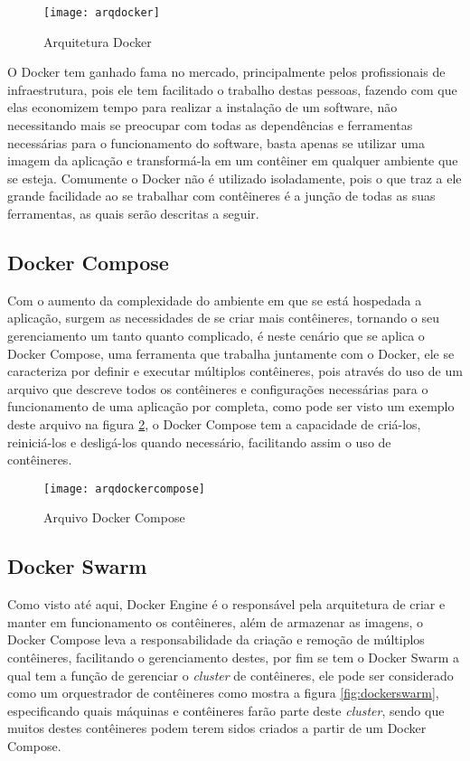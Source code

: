 \begin{figure}[!h]
\caption{\label{fig:arqdocker} Arquitetura Docker}
\begin{center}
\texttt{[image: arqdocker]}
\end{center}
\end{figure}

O Docker tem ganhado fama no mercado, principalmente pelos profissionais de infraestrutura, pois ele tem facilitado o trabalho destas pessoas, fazendo com que elas economizem tempo para realizar a instalação de um software, não necessitando mais se preocupar com todas as dependências e ferramentas necessárias para o funcionamento do software, basta apenas se utilizar uma imagem da aplicação e transformá-la em um contêiner em qualquer ambiente que se esteja. Comumente o Docker não é utilizado isoladamente, pois o que traz a ele grande facilidade ao se trabalhar com contêineres é a junção de todas as suas ferramentas, as quais serão descritas a seguir.~\cite{docker}

\subsection{Docker Compose}
Com o aumento da complexidade do ambiente em que se está hospedada a aplicação, surgem as necessidades de se criar mais contêineres, tornando o seu gerenciamento um tanto quanto complicado, é neste cenário que se aplica o Docker Compose, uma ferramenta que trabalha juntamente com o Docker, ele se caracteriza por definir e executar múltiplos contêineres, pois através do uso de um arquivo que descreve todos os contêineres e configurações necessárias para o funcionamento de uma aplicação por completa, como pode ser visto um exemplo deste arquivo na figura \ref{fig:arqdockercompose}, o Docker Compose tem a capacidade de criá-los, reiniciá-los e desligá-los quando necessário, facilitando assim o uso de contêineres.~\cite{docker}

\begin{figure}[!h]
\caption{\label{fig:arqdockercompose} Arquivo Docker Compose}
\begin{center}
\texttt{[image: arqdockercompose]}
\end{center}
\end{figure}

\subsection{Docker Swarm}
Como visto até aqui, Docker Engine é o responsável pela arquitetura de criar e manter em funcionamento os contêineres, além de armazenar as imagens, o Docker Compose leva a responsabilidade da criação e remoção de múltiplos contêineres, facilitando o gerenciamento destes, por fim se tem o Docker Swarm a qual tem a função de gerenciar o \textit{cluster} de contêineres, ele pode ser considerado como um orquestrador de contêineres como mostra a figura \ref{fig:dockerswarm}, especificando quais máquinas e contêineres farão parte deste \textit{cluster}, sendo que muitos destes contêineres podem terem sidos criados a partir de um Docker Compose.   

